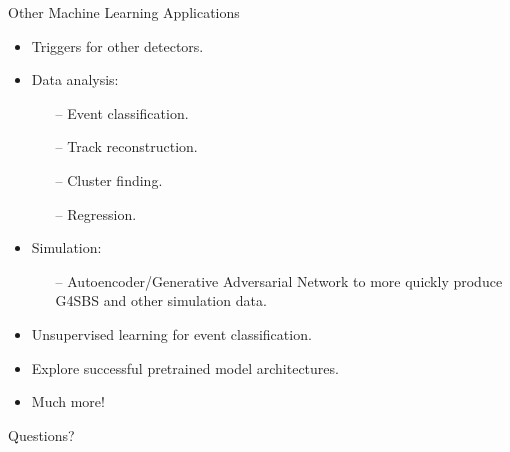 \documentclass[10pt]{beamer}
\begin{document}
\begin{frame}{Other Machine Learning Applications}

	\begin{itemize}
		\item \alert{Triggers} for other detectors.
		\item \alert{Data analysis:}
			\begin{itemize}
				\item[--] Event classification.
				\item[--] Track reconstruction.
				\item[--] Cluster finding.
				\item[--] Regression.
			\end{itemize}
		\item \alert{Simulation:}
			\begin{itemize}
				\item[--] Autoencoder/Generative Adversarial Network to more quickly produce G4SBS and other simulation data.
			\end{itemize}
		\item \alert{Unsupervised learning} for event classification.
		\item Explore successful \alert{pretrained model architectures.}
		\item Much more!
	\end{itemize}

\end{frame}

\begin{frame}

	\begin{center}
		\Huge{\alert{Questions?}}
	\end{center}

\end{frame}
\end{document}
